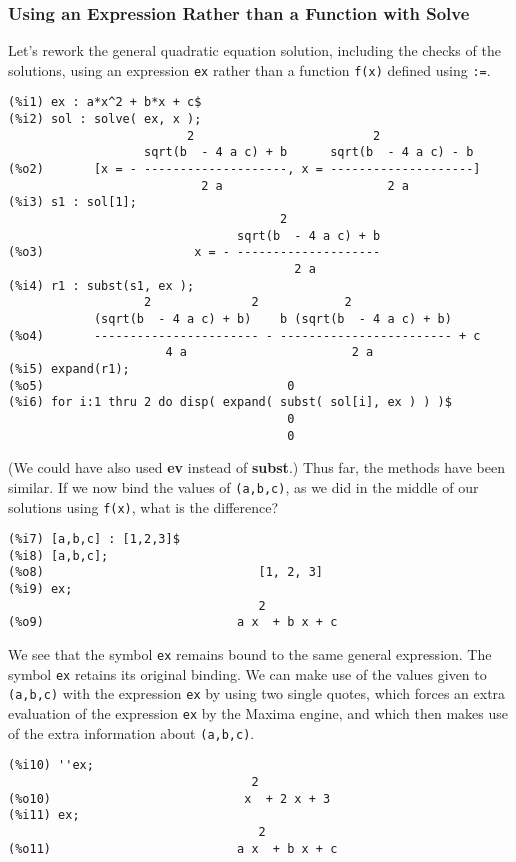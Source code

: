 \documentclass[12pt]{article}
\begin{document}
\subsubsection{Using an Expression Rather than a Function with Solve}
Let's rework the general quadratic equation solution, including the checks of the
  solutions, using an expression \verb|ex| rather than a function \verb|f(x)|
  defined using \verb|:=|.
\small
\begin{verbatim}
(%i1) ex : a*x^2 + b*x + c$
(%i2) sol : solve( ex, x );
                         2                         2
                   sqrt(b  - 4 a c) + b      sqrt(b  - 4 a c) - b
(%o2)       [x = - --------------------, x = --------------------]
                           2 a                       2 a
(%i3) s1 : sol[1];
                                      2
                                sqrt(b  - 4 a c) + b
(%o3)                     x = - --------------------
                                        2 a
(%i4) r1 : subst(s1, ex );
                   2              2            2
            (sqrt(b  - 4 a c) + b)    b (sqrt(b  - 4 a c) + b)
(%o4)       ----------------------- - ------------------------ + c
                      4 a                       2 a
(%i5) expand(r1);
(%o5)                                  0
(%i6) for i:1 thru 2 do disp( expand( subst( sol[i], ex ) ) )$
                                       0
                                       0							   
\end{verbatim}
\normalsize
(We could have also used \textbf{ev} instead of \textbf{subst}.)
\newpage
Thus far, the methods have been similar.
If we now bind the values of \verb|(a,b,c)|, as we did in the middle of our solutions
  using \verb|f(x)|, what  is the difference?
\small
\begin{verbatim}
(%i7) [a,b,c] : [1,2,3]$
(%i8) [a,b,c];
(%o8)                              [1, 2, 3]
(%i9) ex;
                                   2
(%o9)                           a x  + b x + c
\end{verbatim}
\normalsize
We see that the symbol \verb|ex| remains bound to the same general expression.
The symbol \verb|ex| retains its original binding.
We can make use of the values given to \verb|(a,b,c)| with the expression \verb|ex|
  by using two single quotes, which forces an extra evaluation of the expression \verb|ex|
  by the Maxima engine, and which then makes use of the extra information about \verb|(a,b,c)|.
\small
\begin{verbatim}
(%i10) ''ex;
                                  2
(%o10)                           x  + 2 x + 3
(%i11) ex;
                                   2
(%o11)                          a x  + b x + c
\end{verbatim}
\end{document}
